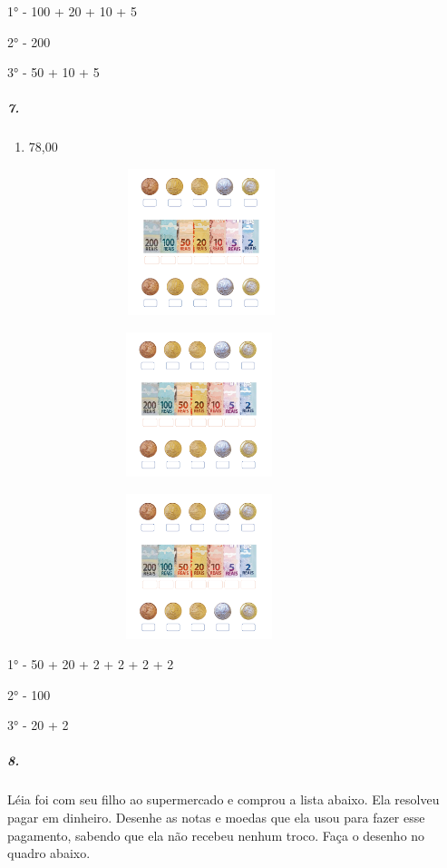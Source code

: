 1° - 100 + 20 + 10 + 5

2° - 200

3° - 50 + 10 + 5

\subparagraph{7.}\label{section-60}

\begin{enumerate}
\def\labelenumi{\alph{enumi})}
\item
  78,00
\end{enumerate}

\includegraphics[width=4.45833in,height=1.68116in]{media/image72.png}

\includegraphics[width=4.40625in,height=1.66152in]{media/image72.png}

\includegraphics[width=4.40625in,height=1.66152in]{media/image72.png}

1° - 50 + 20 + 2 + 2 + 2 + 2

2° - 100

3° - 20 + 2


\subparagraph{8.}\label{section-62}

Léia foi com seu filho ao supermercado e comprou a lista abaixo. Ela
resolveu pagar em dinheiro. Desenhe as notas e moedas que ela usou para
fazer esse pagamento, sabendo que ela não recebeu nenhum troco. Faça o
desenho no quadro abaixo.


